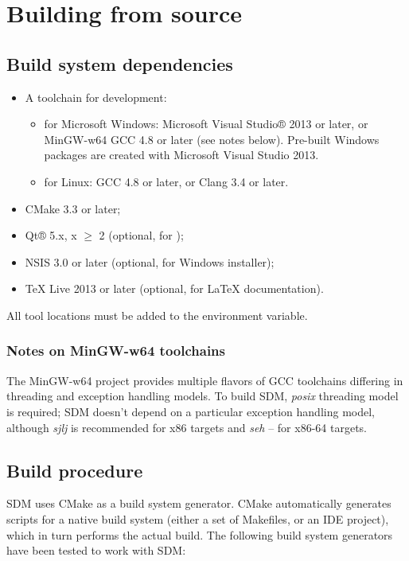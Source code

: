\documentclass[a4paper,12pt,twoside,extrafontsizes]{memoir}
\begin{document}
\section{Building from source}
\label{sec:buildsource}

\subsection{Build system dependencies}
\label{subsec:dependencies}

\begin{itemize}
	\item A toolchain for \cplusplus{} development:
		\begin{itemize}
			\item for Microsoft Windows: Microsoft Visual Studio® 2013 or later, or MinGW-w64 GCC 4.8 or later (see notes below). Pre-built Windows packages are created with Microsoft Visual Studio 2013.
			\item for Linux: GCC 4.8 or later, or Clang 3.4 or later.
		\end{itemize}
	\item CMake 3.3 or later;
	\item Qt® 5.x, x $\ge$ 2 (optional, for );
	\item NSIS 3.0 or later (optional, for Windows installer);
	\item TeX Live 2013 or later (optional, for \LaTeX{} documentation).
\end{itemize}

All tool locations must be added to the  environment variable.

\subsubsection{Notes on MinGW-w64 toolchains}

The MinGW-w64 project provides multiple flavors of GCC toolchains differing in threading and exception handling models. To build SDM, \emph{posix} threading model is required; SDM doesn't depend on a particular exception handling model, although \emph{sjlj} is recommended for x86 targets and \emph{seh} -- for x86-64 targets.

\subsection{Build procedure}

SDM uses CMake as a build system generator. CMake automatically generates scripts for a native build system (either a set of Makefiles, or an IDE project), which in turn performs the actual build. The following build system generators have been tested to work with SDM:
\end{document}
